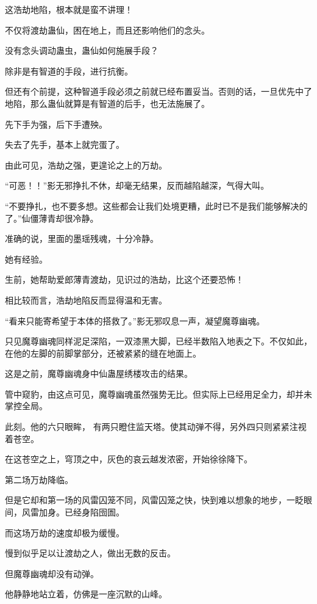 
\begin{this_body}

这浩劫地陷，根本就是蛮不讲理！

不仅将渡劫蛊仙，困在地上，而且还影响他们的念头。

没有念头调动蛊虫，蛊仙如何施展手段？

除非是有智道的手段，进行抗衡。

但还有个前提，这种智道手段必须之前就已经布置妥当。否则的话，一旦优先中了地陷，那么蛊仙就算是有智道的后手，也无法施展了。

先下手为强，后下手遭殃。

失去了先手，基本上就完蛋了。

由此可见，浩劫之强，更遑论之上的万劫。

“可恶！！”影无邪挣扎不休，却毫无结果，反而越陷越深，气得大叫。

“不要挣扎，也不要多想。这些都会让我们处境更糟，此时已不是我们能够解决的了。”仙僵薄青却很冷静。

准确的说，里面的墨瑶残魂，十分冷静。

她有经验。

生前，她帮助爱郎薄青渡劫，见识过的浩劫，比这个还要恐怖！

相比较而言，浩劫地陷反而显得温和无害。

“看来只能寄希望于本体的搭救了。”影无邪叹息一声，凝望魔尊幽魂。

只见魔尊幽魂同样泥足深陷，一双漆黑大脚，已经半数陷入地表之下。不仅如此，在他的左脚的前脚掌部分，还被紧紧的缝在地面上。

这是之前，魔尊幽魂身中仙蛊屋绣楼攻击的结果。

管中窥豹，由这点可见，魔尊幽魂虽然强势无比。但实际上已经用足全力，却并未掌控全局。

此刻。他的六只眼眸， 有两只瞪住监天塔。使其动弹不得，另外四只则紧紧注视着苍空。

在这苍空之上，穹顶之中，灰色的哀云越发浓密，开始徐徐降下。

第二场万劫降临。

但是它却和第一场的风雷囚笼不同，风雷囚笼之快，快到难以想象的地步，一眨眼间，风雷加身。已经身陷囹圄。

而这场万劫的速度却极为缓慢。

慢到似乎足以让渡劫之人，做出无数的反击。

但魔尊幽魂却没有动弹。

他静静地站立着，仿佛是一座沉默的山峰。


\end{this_body}
